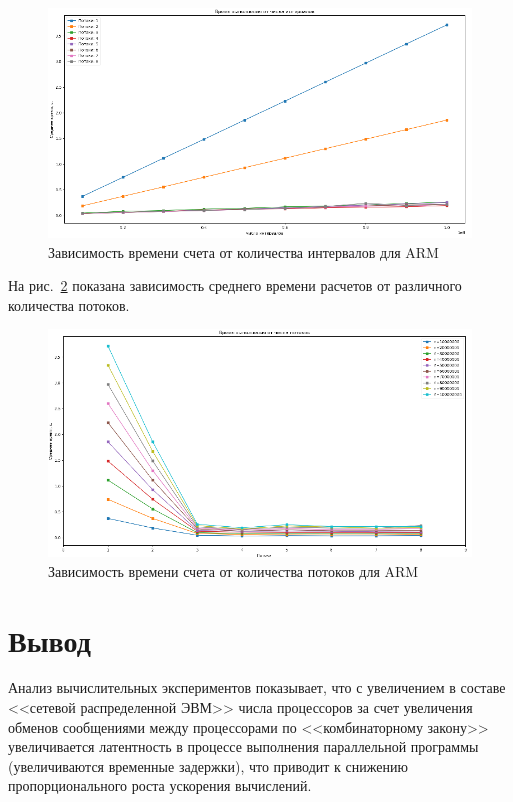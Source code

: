 \documentclass{altsu-bachelor}
\begin{document}
\begin{figure}[H]
    \centering
    \includegraphics[scale=0.8]{images/time_intervals.png}
    \caption{Зависимость времени счета от количества интервалов для ARM}
    \label{fig:time_arm}
\end{figure}

На рис.~\ref{fig:time_threads} показана зависимость среднего времени расчетов от различного количества потоков.

\begin{figure}[H]
    \centering
    \includegraphics[scale=0.8]{images/time_threads.png}
    \caption{Зависимость времени счета от количества потоков для ARM}
    \label{fig:time_threads}
\end{figure}

\section*{Вывод}

Анализ вычислительных экспериментов показывает, что с увеличением в составе <<сетевой распределенной ЭВМ>> числа процессоров за счет увеличения обменов сообщениями между процессорами по <<комбинаторному закону>> увеличивается латентность в процессе выполнения параллельной программы (увеличиваются временные задержки), что приводит к снижению пропорционального роста ускорения вычислений.
\end{document}
